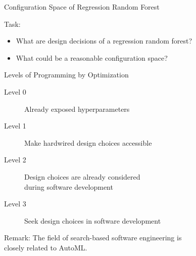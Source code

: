 \begin{frame}{Configuration Space of Regression Random Forest}

Task: \hands [5min]
\begin{itemize}
  \item What are design decisions of a regression random forest?
  \item What could be a reasonable configuration space?  
\end{itemize}

\end{frame}
\begin{frame}[c]{Levels of Programming by Optimization }

\begin{description}
\item[Level 0] Already exposed hyperparameters
\pause
\item[Level 1] Make hardwired design choices accessible
\pause
\item[Level 2] Design choices are already considered\\ during software development
\pause 
\item[Level 3] Seek design choices in software development
\end{description}

\pause
\bigskip

Remark: The field of search-based software engineering is\\ closely related to AutoML.

\end{frame}
